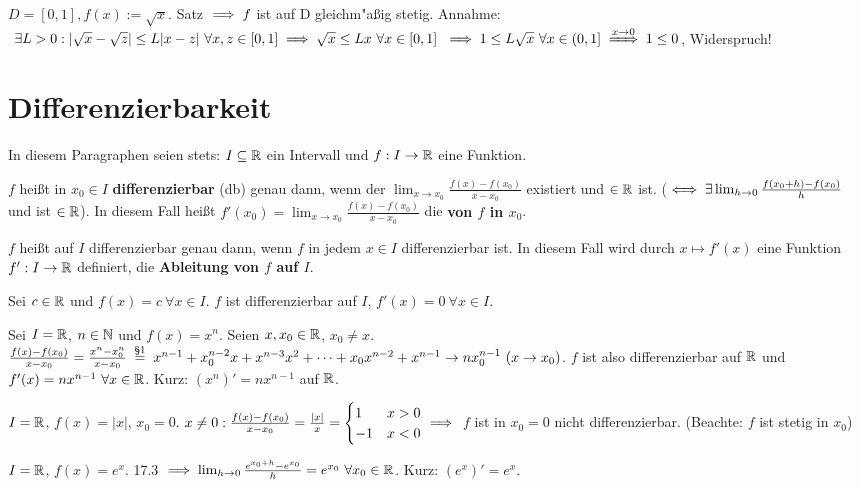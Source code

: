 \documentclass[a4paper,twoside,DIV15,BCOR12mm]{scrbook}
\begin{document}
\begin{beispiel}
$D=[0,1], f(x):=\sqrt{x}$. Satz $\implies f$ ist auf D gleichm"aßig stetig. Annahme: $\ \exists L>0: |\sqrt{x}-\sqrt{z}|\le L|x-z| \ \forall x,z \in [0,1] \folgt \sqrt{x} \le Lx\ \forall x \in [0,1]\ \folgt 1\le L\sqrt{x}\ \forall x \in (0,1] \folgtwegen{x\to0}1\le0$, Widerspruch!
\end{beispiel}

\chapter{Differenzierbarkeit}

In diesem Paragraphen seien stets: $I\subseteq\mathbb{R}$ ein Intervall und $f:I\to\mathbb{R}$ eine Funktion.

\begin{definition}
\begin{liste}
\item $f$ heißt in $x_0\in I$ \textbf{differenzierbar} (db) genau dann, wenn der $\lim_{x\to x_0}\frac{f(x) - f(x_0) }{x-x_0}$ existiert und $\in\mathbb{R}$ ist. ($\iff \exists \lim_{h\to0}\frac{f(x_0+h) - f(x_0)}{h}$ und ist $\in\mathbb{R}$). In diesem Fall heißt $f'(x_0) = \lim_{x\to x_0}\frac{f(x) - f(x_0) }{x-x_0}$ die  \textbf{von $f$ in $x_0$}.

\item $f$ heißt auf $I$ differenzierbar genau dann, wenn $f$ in jedem $x\in I$ differenzierbar ist. In diesem Fall wird durch $x\mapsto f'(x)$ eine Funktion $f': I\to\mathbb{R}$ definiert, die \textbf{Ableitung von $f$ auf $I$}.
\end{liste}
\end{definition}

\begin{beispiele}
\item Sei $c\in\mathbb{R}$ und $f(x)=c\ \forall x\in I$. $f$ ist differenzierbar auf $I$, $f'(x)=0 \ \forall x \in I$.
\item Sei $I=\mathbb{R} $, $n\in\mathbb{N}$ und $f(x)=x^n$. Seien $x, x_0 \in\mathbb{R}$, $x_0 \ne x$. $\frac{f(x)-f(x_0)}{x-x_0} = \frac{x^n-x_0^n}{x-x_0} \gleichnach{§1} x^{n-1}+x_0^{n-2}x+x^{n-3}x^2+\cdots +x_0x^{n-2} + x^{n-1} \to nx_0^{n-1}\ (x\to x_0)$. $f$ ist also differenzierbar auf $\mathbb{R}$ und $f'(x) = nx^{n-1} \ \forall x\in\mathbb{R}$. Kurz: $(x^n)' = nx^{n-1}$ auf $\mathbb{R}$.
\item $I=\mathbb{R}$, $f(x)=|x|$, $x_0 = 0$. $x\ne0: \frac{f(x)-f(x_0)}{x-x_0} = \frac{|x|}{x} = \begin{cases}1&x>0\\-1&x<0\end{cases} \implies$ $f$ ist in $x_0=0$ nicht differenzierbar. (Beachte: $f$ ist stetig in $x_0$)
\item $I=\mathbb{R}$, $f(x)=e^x$. 17.3 $\implies \lim_{h\to0}\frac{e^{x_0+h} - e^{x_0}}{h} = e^{x_0} \ \forall x_0 \in\mathbb{R}$. Kurz: $(e^x)' = e^x$.
\end{beispiele}
\end{document}
